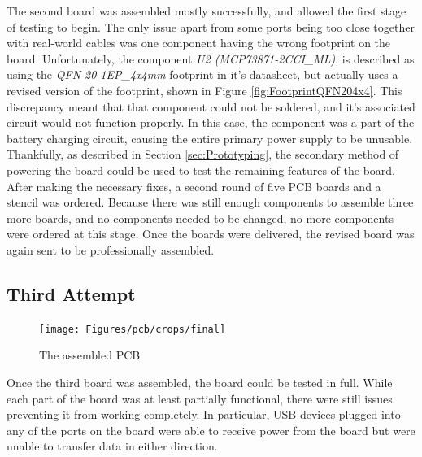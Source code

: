 The second board was assembled mostly successfully, and allowed the first stage of testing to begin.
The only issue apart from some ports being too close together with real-world cables was one component having the wrong footprint on the board.
Unfortunately, the component \emph{U2 (MCP73871-2CCI\_ML)}, is described as using the \emph{QFN-20-1EP\_4x4mm} footprint in it's datasheet, but actually uses a revised version of the footprint, shown in Figure \ref{fig:FootprintQFN204x4}.
This discrepancy meant that that component could not be soldered, and it's associated circuit would not function properly.
In this case, the component was a part of the battery charging circuit, causing the entire primary power supply to be unusable.
Thankfully, as described in Section \ref{sec:Prototyping}, the secondary method of powering the board could be used to test the remaining features of the board.
After making the necessary fixes, a second round of five PCB boards and a stencil was ordered.
Because there was still enough components to assemble three more boards, and no components needed to be changed, no more components were ordered at this stage.
Once the boards were delivered, the revised board was again sent to be professionally assembled.

\subsection{Third Attempt}\label{subsec:Manufacturing3}

\begin{figure}[t]
  \centering
  \texttt{[image: Figures/pcb/crops/final]}
  \caption[Assembled PCB]{The assembled PCB}
  \label{fig:AssembledPCB}
\end{figure}

Once the third board was assembled, the board could be tested in full.
While each part of the board was at least partially functional, there were still issues preventing it from working completely.
In particular, USB devices plugged into any of the ports on the board were able to receive power from the board but were unable to transfer data in either direction.
